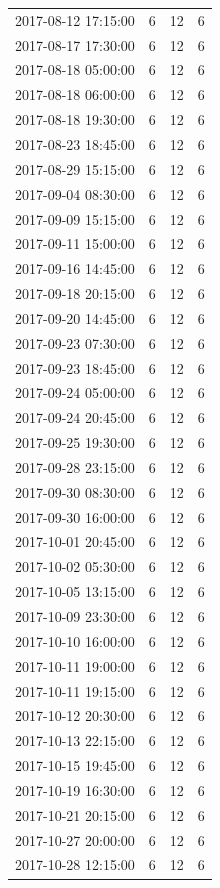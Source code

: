 \begin{tabular}{lrrr}
2017-08-12 17:15:00 & 6 & 12 & 6 \\
2017-08-17 17:30:00 & 6 & 12 & 6 \\
2017-08-18 05:00:00 & 6 & 12 & 6 \\
2017-08-18 06:00:00 & 6 & 12 & 6 \\
2017-08-18 19:30:00 & 6 & 12 & 6 \\
2017-08-23 18:45:00 & 6 & 12 & 6 \\
2017-08-29 15:15:00 & 6 & 12 & 6 \\
2017-09-04 08:30:00 & 6 & 12 & 6 \\
2017-09-09 15:15:00 & 6 & 12 & 6 \\
2017-09-11 15:00:00 & 6 & 12 & 6 \\
2017-09-16 14:45:00 & 6 & 12 & 6 \\
2017-09-18 20:15:00 & 6 & 12 & 6 \\
2017-09-20 14:45:00 & 6 & 12 & 6 \\
2017-09-23 07:30:00 & 6 & 12 & 6 \\
2017-09-23 18:45:00 & 6 & 12 & 6 \\
2017-09-24 05:00:00 & 6 & 12 & 6 \\
2017-09-24 20:45:00 & 6 & 12 & 6 \\
2017-09-25 19:30:00 & 6 & 12 & 6 \\
2017-09-28 23:15:00 & 6 & 12 & 6 \\
2017-09-30 08:30:00 & 6 & 12 & 6 \\
2017-09-30 16:00:00 & 6 & 12 & 6 \\
2017-10-01 20:45:00 & 6 & 12 & 6 \\
2017-10-02 05:30:00 & 6 & 12 & 6 \\
2017-10-05 13:15:00 & 6 & 12 & 6 \\
2017-10-09 23:30:00 & 6 & 12 & 6 \\
2017-10-10 16:00:00 & 6 & 12 & 6 \\
2017-10-11 19:00:00 & 6 & 12 & 6 \\
2017-10-11 19:15:00 & 6 & 12 & 6 \\
2017-10-12 20:30:00 & 6 & 12 & 6 \\
2017-10-13 22:15:00 & 6 & 12 & 6 \\
2017-10-15 19:45:00 & 6 & 12 & 6 \\
2017-10-19 16:30:00 & 6 & 12 & 6 \\
2017-10-21 20:15:00 & 6 & 12 & 6 \\
2017-10-27 20:00:00 & 6 & 12 & 6 \\
2017-10-28 12:15:00 & 6 & 12 & 6 \\

\end{tabular}

